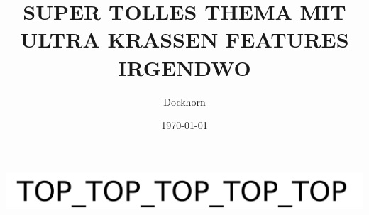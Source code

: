 \documentclass[11pt,aspectratio=169]{beamer}%
\title{
\textcolor{cl1}{\Huge SUPER TOLLES THEMA}\newline
\textcolor{cl1!50}{\normalsize MIT ULTRA KRASSEN FEATURES}\newline
\textcolor{cl1!50}{\tiny IRGENDWO}
}
\author{\tiny Dockhorn}
\date{\vspace*{-0.5cm}\tiny\today{}}
\begin{document}
\begin{frame}
\includegraphics[width=\textwidth]{logo/top.png}\\\vspace{1cm}
\maketitle
\thispagestyle{empty}
\end{frame}
\end{document}
